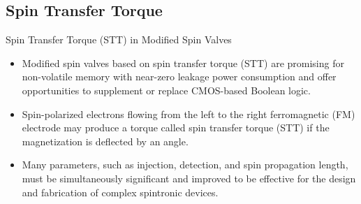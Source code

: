 \documentclass[handout,t]{beamer}
\begin{document}
\subsection{Spin Transfer Torque}
\begin{frame}{Spin Transfer Torque (STT) in Modified Spin Valves}
	\begin{itemize}
		\item Modified spin valves based on spin transfer torque (STT) are promising for non-volatile memory with near-zero leakage power consumption and offer opportunities to supplement or replace CMOS-based Boolean logic.
		\item Spin-polarized electrons flowing from the left to the right ferromagnetic (FM) electrode may produce a torque called spin transfer torque (STT) if the magnetization is deflected by an angle.
		\item Many parameters, such as injection, detection, and spin propagation length, must be simultaneously significant and improved to be effective for the design and fabrication of complex spintronic devices.
	\end{itemize}
\end{frame}
\end{document}
